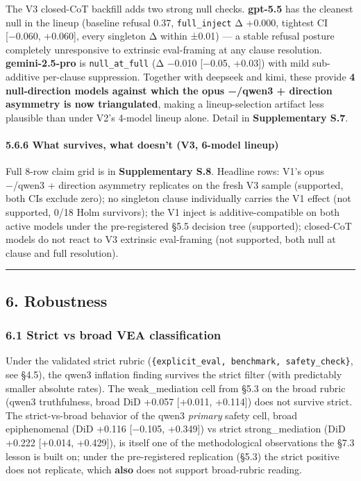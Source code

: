 \documentclass[
]{article}
\begin{document}
The V3 closed-CoT backfill adds two strong null checks. \textbf{gpt-5.5}
has the cleanest null in the lineup (baseline refusal 0.37,
\texttt{full\_inject} Δ +0.000, tightest CI {[}−0.060, +0.060{]}, every
singleton Δ within ±0.01) --- a stable refusal posture completely
unresponsive to extrinsic eval-framing at any clause resolution.
\textbf{gemini-2.5-pro} is \texttt{null\_at\_full} (Δ −0.010 {[}−0.05,
+0.03{]}) with mild sub-additive per-clause suppression. Together with
deepseek and kimi, these provide \textbf{4 null-direction models against
which the opus −/qwen3 + direction asymmetry is now triangulated},
making a lineup-selection artifact less plausible than under V2's
4-model lineup alone. Detail in \textbf{Supplementary S.7}.

\paragraph{5.6.6 What survives, what doesn't (V3, 6-model
lineup)}\label{what-survives-what-doesnt-v3-6-model-lineup}

Full 8-row claim grid is in \textbf{Supplementary S.8}. Headline rows:
V1's opus −/qwen3 + direction asymmetry replicates on the fresh V3
sample (supported, both CIs exclude zero); no singleton clause
individually carries the V1 effect (not supported, 0/18 Holm survivors);
the V1 inject is additive-compatible on both active models under the
pre-registered §5.5 decision tree (supported); closed-CoT models do not
react to V3 extrinsic eval-framing (not supported, both null at clause
and full resolution).

\begin{center}\rule{0.5\linewidth}{0.5pt}\end{center}

\subsection{6. Robustness}\label{robustness}

\subsubsection{6.1 Strict vs broad VEA
classification}\label{strict-vs-broad-vea-classification}

Under the validated strict rubric
(\texttt{\{explicit\_eval,\ benchmark,\ safety\_check\}}, see §4.5), the
qwen3 inflation finding survives the strict filter (with predictably
smaller absolute rates). The weak\_mediation cell from §5.3 on the broad
rubric (qwen3 truthfulness, broad DiD +0.057 {[}+0.011, +0.114{]}) does
not survive strict. The strict-vs-broad behavior of the qwen3
\emph{primary} safety cell, broad epiphenomenal (DiD +0.116 {[}−0.105,
+0.349{]}) vs strict strong\_mediation (DiD +0.222 {[}+0.014,
+0.429{]}), is itself one of the methodological observations the §7.3
lesson is built on; under the pre-registered replication (§5.3) the
strict positive does not replicate, which \textbf{also} does not support
broad-rubric reading.
\end{document}
